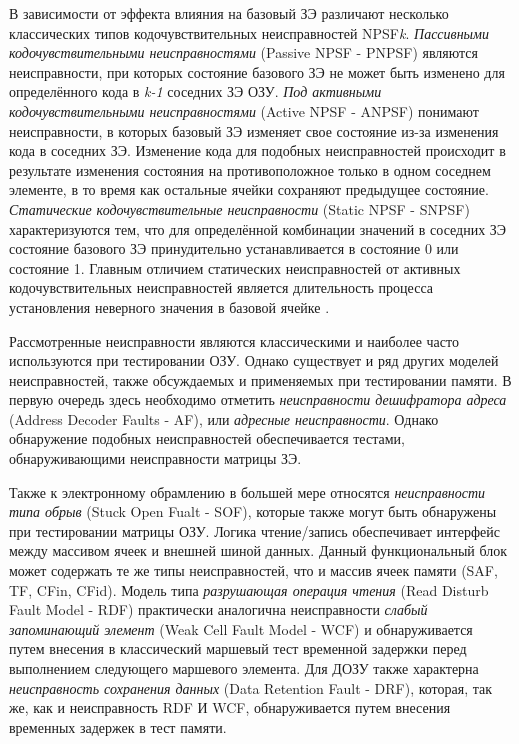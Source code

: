 В зависимости от эффекта влияния на базовый ЗЭ различают несколько классических типов кодочувствительных неисправностей NPSF\textit{k}.
\textit{Пассивными кодочувствительными неисправностями} (Passive NPSF - PNPSF) являются неисправности, при которых состояние базового ЗЭ не может быть изменено для определённого кода в \textit{k-1} соседних ЗЭ ОЗУ. 
\textit{Под активными кодочувствительными неисправностями} (Active NPSF - ANPSF) понимают неисправности, в которых базовый ЗЭ изменяет свое состояние из-за изменения кода в соседних ЗЭ. Изменение кода для подобных неисправностей происходит в результате изменения состояния на противоположное только в одном соседнем элементе, в то время как остальные ячейки сохраняют предыдущее состояние.
\textit{Статические кодочувствительные неисправности} (Static NPSF - SNPSF) характеризуются тем, что для определённой комбинации значений в соседних ЗЭ состояние базового ЗЭ принудительно устанавливается в состояние 0 или состояние 1. Главным отличием статических неисправностей от активных кодочувствительных неисправностей является длительность процесса установления неверного значения в базовой ячейке \cite{faults}.

Рассмотренные неисправности являются классическими и наиболее часто используются при тестировании ОЗУ. Однако существует и ряд других моделей неисправностей, также обсуждаемых и применяемых при тестировании памяти. В первую очередь здесь необходимо отметить \textit{неисправности дешифратора адреса} (Address Decoder Faults - AF), или \textit{адресные неисправности}. Однако обнаружение подобных неисправностей обеспечивается тестами, обнаруживающими неисправности матрицы ЗЭ.

Также к электронному обрамлению в большей мере относятся \textit{неисправности типа обрыв} (Stuck Open Fualt - SOF), которые также могут быть обнаружены при тестировании матрицы ОЗУ.
Логика чтение/запись обеспечивает интерфейс между массивом ячеек и внешней шиной данных. Данный функциональный блок может содержать те же типы неисправностей, что и массив ячеек памяти (SAF, TF, CFin, CFid). 
Модель типа \textit{разрушающая операция чтения} (Read Disturb Fault Model - RDF) практически аналогична неисправности \textit{слабый запоминающий элемент} (Weak Cell Fault Model - WCF) и обнаруживается путем внесения в классический маршевый тест временной задержки перед выполнением следующего маршевого элемента. Для ДОЗУ также характерна \textit{неисправность сохранения данных} (Data Retention Fault - DRF), которая, так же, как и неисправность RDF И WCF, обнаруживается путем внесения временных задержек в тест памяти.  

